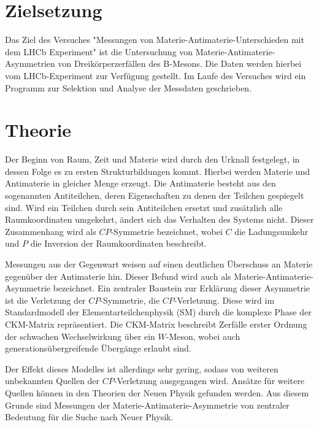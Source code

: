 \section{Zielsetzung}
Das Ziel des Versuches "Messungen von Materie-Antimaterie-Unterschieden mit dem LHCb Experiment" ist die Untersuchung von Materie-Antimaterie-Asymmetrien von Dreikörperzerfällen des B-Mesons. Die Daten werden hierbei vom LHCb-Experiment zur Verfügung gestellt. Im Laufe des Versuches wird ein Programm zur Selektion und Analyse der Messdaten geschrieben.

\section{Theorie}
Der Beginn von Raum, Zeit und Materie wird durch den Urknall festgelegt, in dessen Folge es zu ersten Strukturbildungen kommt.
Hierbei werden Materie und Antimaterie in gleicher Menge erzeugt. Die Antimaterie besteht aus den sogenannten Antiteilchen, deren Eigenschaften zu denen der Teilchen gespiegelt sind. Wird ein Teilchen durch sein Antiteilchen ersetzt und zusätzlich alle Raumkoordinaten umgekehrt, ändert sich das Verhalten des Systems nicht. Dieser Zusammenhang wird als $CP$-Symmetrie bezeichnet, wobei $C$ die Ladungsumkehr und $P$ die Inversion der Raumkoordinaten beschreibt.

Messungen aus der Gegenwart weisen auf einen deutlichen Überschuss an Materie gegenüber der Antimaterie hin. Dieser Befund wird auch als Materie-Antimaterie-Asymmetrie bezeichnet. Ein zentraler Baustein zur Erklärung dieser Asymmetrie ist die Verletzung der $CP$-Symmetrie, die $CP$-Verletzung. Diese wird im Standardmodell der Elementarteilchenphysik (SM) durch die komplexe Phase der CKM-Matrix repräsentiert. Die CKM-Matrix beschreibt Zerfälle erster Ordnung der schwachen Wechselwirkung über ein $W$-Meson, wobei auch generationsübergreifende Übergänge erlaubt sind. 

Der Effekt dieses Modelles ist allerdings sehr gering, sodass von weiteren unbekannten Quellen der $CP$-Verletzung ausgegangen wird. Ansätze für weitere Quellen können in den Theorien der Neuen Physik gefunden werden. Aus diesem Grunde sind Messungen der Materie-Antimaterie-Asymmetrie von zentraler Bedeutung für die Suche nach Neuer Physik.

